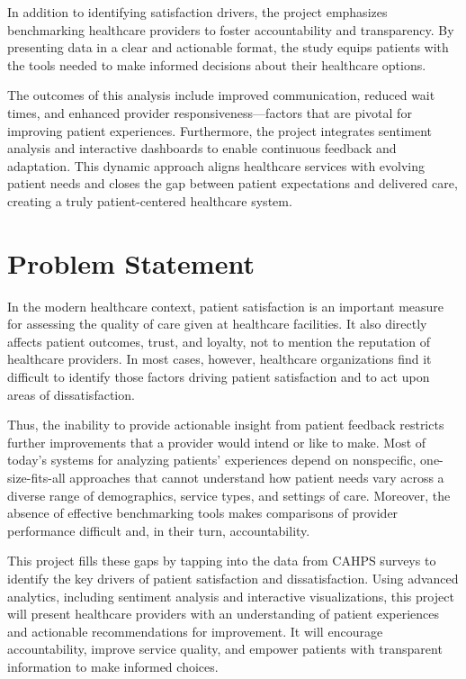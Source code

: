 In addition to identifying satisfaction drivers, the project emphasizes benchmarking healthcare providers to foster accountability and transparency. By presenting data in a clear and actionable format, the study equips patients with the tools needed to make informed decisions about their healthcare options.

The outcomes of this analysis include improved communication, reduced wait times, and enhanced provider responsiveness—factors that are pivotal for improving patient experiences. Furthermore, the project integrates sentiment analysis and interactive dashboards to enable continuous feedback and adaptation. This dynamic approach aligns healthcare services with evolving patient needs and closes the gap between patient expectations and delivered care, creating a truly patient-centered healthcare system.



\section{Problem Statement}
\IEEEPARstart In the modern healthcare context, patient satisfaction is an important measure for assessing the quality of care given at healthcare facilities. It also directly affects patient outcomes, trust, and loyalty, not to mention the reputation of healthcare providers. In most cases, however, healthcare organizations find it difficult to identify those factors driving patient satisfaction and to act upon areas of dissatisfaction.

Thus, the inability to provide actionable insight from patient feedback restricts further improvements that a provider would intend or like to make. Most of today's systems for analyzing patients' experiences depend on nonspecific, one-size-fits-all approaches that cannot understand how patient needs vary across a diverse range of demographics, service types, and settings of care. Moreover, the absence of effective benchmarking tools makes comparisons of provider performance difficult and, in their turn, accountability.

This project fills these gaps by tapping into the data from CAHPS surveys to identify the key drivers of patient satisfaction and dissatisfaction. Using advanced analytics, including sentiment analysis and interactive visualizations, this project will present healthcare providers with an understanding of patient experiences and actionable recommendations for improvement. It will encourage accountability, improve service quality, and empower patients with transparent information to make informed choices.

